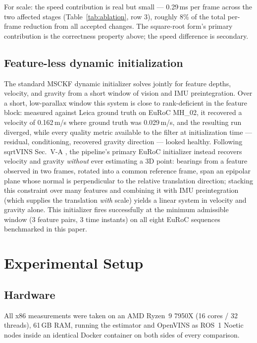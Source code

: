 \documentclass[10pt,conference,letterpaper]{IEEEtran}
\begin{document}
For scale: the speed contribution is real but small --- 0.29\,ms per
frame across the two affected stages (Table~\ref{tab:ablation}, row 3),
roughly 8\% of the total per-frame reduction from all accepted changes.
The square-root form's primary contribution is the correctness property
above; the speed difference is secondary.

\subsection{Feature-less dynamic initialization}
\label{sec:featureless-init}

The standard MSCKF dynamic initializer solves jointly for feature depths,
velocity, and gravity from a short window of vision and IMU preintegration.
Over a short, low-parallax window this system is close to rank-deficient in
the feature block: measured against Leica ground truth on EuRoC MH\_02, it
recovered a velocity of 0.162\,m/s where ground truth was 0.029\,m/s, and the
resulting run diverged, while every quality metric available to the filter
at initialization time --- residual, conditioning, recovered gravity
direction --- looked healthy. Following sqrtVINS Sec.~V-A
\cite{peng2025sqrtvins}, the pipeline's primary EuRoC initializer instead
recovers velocity and gravity \emph{without} ever estimating a 3D point:
bearings from a feature observed in two frames, rotated into a common
reference frame, span an epipolar plane whose normal is perpendicular to the
relative translation direction; stacking this constraint over many features
and combining it with IMU preintegration (which supplies the translation
\emph{with} scale) yields a linear system in velocity and gravity alone. This
initializer fires successfully at the minimum admissible window
(3 feature pairs, 3 time instants) on all eight EuRoC sequences benchmarked
in this paper.

\section{Experimental Setup}
\label{sec:setup}

\subsection{Hardware}
All x86 measurements were taken on an AMD Ryzen~9 7950X (16 cores / 32
threads), 61\,GB RAM, running the estimator and OpenVINS as ROS~1 Noetic
nodes inside an identical Docker container on both sides of every comparison.
\end{document}
